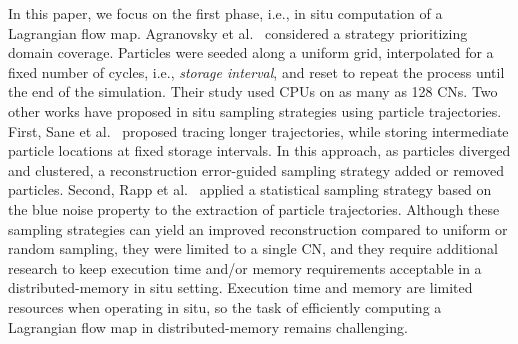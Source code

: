 In this paper, we focus on the first phase, i.e., in situ computation of a Lagrangian flow map.
%
Agranovsky et al.~\cite{agranovsky2014improved} considered a strategy prioritizing domain coverage.
%
Particles were seeded along a uniform grid, interpolated for a fixed number of cycles, i.e., \textit{storage interval}, and reset to repeat the process until the end of the simulation.
%
Their study used CPUs on as many as 128 CNs.
%
Two other works have proposed in situ sampling strategies using particle trajectories. 
%
First, Sane et al.~\cite{sane2019interpolation} proposed tracing longer trajectories, while storing intermediate particle locations at fixed storage intervals. 
%
In this approach, as particles diverged and clustered, a reconstruction error-guided sampling strategy added or removed particles.
%
%
%
Second, Rapp et al.~\cite{rapp2019void} applied a statistical sampling strategy based on the blue noise property to the extraction of particle trajectories. 
%
%
Although these sampling strategies can yield an improved reconstruction compared to uniform or random sampling, they were limited to a single CN, and they require additional research to keep execution time and/or memory requirements acceptable in a distributed-memory in situ setting. 
%
%
Execution time and memory are limited resources when operating in situ, so the task of efficiently computing a Lagrangian flow map in distributed-memory remains challenging.

